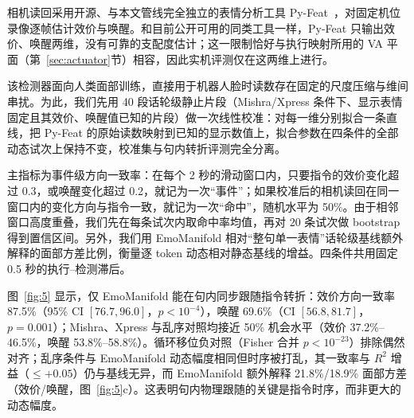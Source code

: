 \documentclass[letterpaper, 10 pt, conference]{ieeeconf/ieeeconf}
\begin{document}
相机读回采用开源、与本文管线完全独立的表情分析工具 Py-Feat~\cite{cheong2023pyfeat}，对固定机位录像逐帧估计效价与唤醒。和目前公开可用的同类工具一样，Py-Feat 只输出效价、唤醒两维，没有可靠的支配度估计；这一限制恰好与执行映射所用的 VA 平面（第~\ref{sec:actuator}节）相容，因此实机评测仅在这两维上进行。

该检测器面向人类面部训练，直接用于机器人脸时读数存在固定的尺度压缩与维间串扰。为此，我们先用 40 段话轮级静止片段（Mishra/Xpress 条件下、显示表情固定且其效价、唤醒值已知的片段）做一次线性校准：对每一维分别拟合一条直线，把 Py-Feat 的原始读数映射到已知的显示数值上，拟合参数在四条件的全部动态试次上保持不变，校准集与句内转折评测完全分离。

主指标为事件级方向一致率：在每个 2 秒的滑动窗口内，只要指令的效价变化超过 0.3，或唤醒变化超过 0.2，就记为一次``事件''；如果校准后的相机读回在同一窗口内的变化方向与指令一致，就记为一次``命中''，随机水平为 50\%。由于相邻窗口高度重叠，我们先在每条试次内取命中率均值，再对 20 条试次做 bootstrap 得到置信区间。另外，我们用 EmoManifold 相对``整句单一表情''话轮级基线额外解释的面部方差比例，衡量逐 token 动态相对静态基线的增益。四条件共用固定 0.5 秒的执行--检测滞后。

图~\ref{fig:5} 显示，仅 EmoManifold 能在句内同步跟随指令转折：效价方向一致率 87.5\%（95\% CI $[76.7,96.0]$，$p<10^{-4}$），唤醒 69.6\%（CI $[56.8,81.7]$，$p{=}0.001$）；Mishra、Xpress 与乱序对照均接近 50\% 机会水平（效价 37.2\%--46.5\%，唤醒 53.8\%--58.8\%）。循环移位负对照（Fisher 合并 $p<10^{-23}$）排除偶然对齐；乱序条件与 EmoManifold 动态幅度相同但时序被打乱，其一致率与 $R^2$ 增益（$\le+0.05$）仍与基线无异，而 EmoManifold 额外解释 21.8\%/18.9\% 面部方差（效价/唤醒，图~\ref{fig:5}c）。这表明句内物理跟随的关键是指令时序，而非更大的动态幅度。
\begin{table}[t]
    \caption{实机部署延迟（均值 $\pm$ 标准差，$n{=}20$）。}
    \label{tab:latency}
    \centering
    \end{table}
\end{document}

